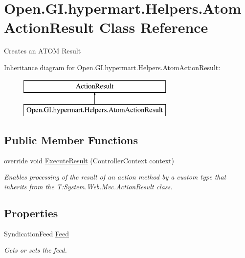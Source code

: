 \hypertarget{class_open_1_1_g_i_1_1hypermart_1_1_helpers_1_1_atom_action_result}{}\section{Open.\+G\+I.\+hypermart.\+Helpers.\+Atom\+Action\+Result Class Reference}
\label{class_open_1_1_g_i_1_1hypermart_1_1_helpers_1_1_atom_action_result}


Creates an A\+T\+O\+M Result  


Inheritance diagram for Open.\+G\+I.\+hypermart.\+Helpers.\+Atom\+Action\+Result\+:\begin{figure}[H]
\begin{center}
\leavevmode
\includegraphics[height=2.000000cm]{class_open_1_1_g_i_1_1hypermart_1_1_helpers_1_1_atom_action_result}
\end{center}
\end{figure}
\subsection*{Public Member Functions}
\begin{DoxyCompactItemize}
\item 
override void \hyperlink{class_open_1_1_g_i_1_1hypermart_1_1_helpers_1_1_atom_action_result_a525b622f00e4c2294a4fedb438273981}{Execute\+Result} (Controller\+Context context)
\begin{DoxyCompactList}\small\item\em Enables processing of the result of an action method by a custom type that inherits from the T\+:\+System.\+Web.\+Mvc.\+Action\+Result class. \end{DoxyCompactList}\end{DoxyCompactItemize}
\subsection*{Properties}
\begin{DoxyCompactItemize}
\item 
Syndication\+Feed \hyperlink{class_open_1_1_g_i_1_1hypermart_1_1_helpers_1_1_atom_action_result_a17a5a951bdf5ed9f8a93f24843e124ca}{Feed}
\begin{DoxyCompactList}\small\item\em Gets or sets the feed. \end{DoxyCompactList}\end{DoxyCompactItemize}


